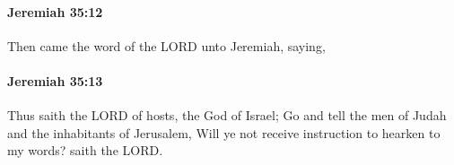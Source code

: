 		\paragraph{Jeremiah 35:12} %
			\label{JEREMIAH-35-12}

			Then came the word of the LORD unto Jeremiah, saying,


		\paragraph{Jeremiah 35:13} %
			\label{JEREMIAH-35-13}

			Thus saith the LORD of hosts, the God of Israel; Go and tell the men of Judah and the inhabitants of Jerusalem, Will ye not receive instruction to hearken to my words? saith the LORD.


